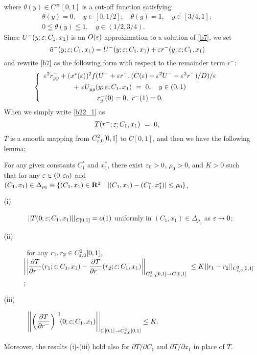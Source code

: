 \documentclass[a4,10pt]{article}
\begin{document}
%
where $\theta(y) \in C^{\infty}[0,1]$ is a cut-off function satisfying 
\begin{equation*}
\begin{array}{c}
\theta(y) = 0, \quad y \in [0, 1/2]; \quad \theta(y) = 1, \quad y \in [3/4, 1]; \\[1ex]
 0 \leqq \theta(y) \leqq 1, \quad y \in (1/2, 3/4). 
\end{array}
\end{equation*}
Since $U^-(y;\varepsilon;C_1,x_1)$ is an $O(\varepsilon)$ approximation to a solution of \eqref{b7}, we set
%
\begin{equation}\label{b22_0}
\tilde{u}^-(y;\varepsilon;C_1,x_1) = U^-(y;\varepsilon;C_1,x_1) + \varepsilon r^-(y;\varepsilon;C_1,x_1) 
\end{equation}
%
and rewrite \eqref{b7} as the following form with respect to the remainder term $r^-$: 
%
\begin{equation}\label{b22_1}
\left \{
\begin{array}{c}
\varepsilon^2 r^-_{yy} + (x^*(\varepsilon))^2 f(U^- +\varepsilon r^- ,  (C(\varepsilon) - \varepsilon^2 U^- -\varepsilon^3 r^- )/D ) /\varepsilon \\[1ex]
+ \ \varepsilon U^-_{yy}(y;\varepsilon;C_1,x_1) \ = \ 0, \ \ \ y \in (0, 1)   \\[1ex]
r^-_y(0) = 0, \ r^-(1) = 0.
\end{array} 
\right.
\end{equation}
%
When we simply write \eqref{b22_1} as 
\begin{equation}\label{b22_2}
\begin{array}{c}
T(r^-;\varepsilon;C_1,x_1) \ = \ 0, 
\end{array} 
\end{equation}
$T$ is a smooth mapping from $C^2_{\varepsilon,0}[0,1]$ to $C[0,1]$, and then we have the following lemma: 
%
\begin{lemma}\label{lem1b} 
For any given constants $C_1^*$ and $x_1^*$, there exist $\varepsilon_0 > 0$, $\rho_0 > 0$, and $K >0$ such that for any 
$\varepsilon \in (0, \varepsilon_0)$ and $(C_1,x_1) \in \Delta_{\rho_0} \equiv \{(C_1,x_1) \in {\bf R}^2 \ | \ |(C_1,x_1) - (C^*_1,x^*_1)| \leq \rho_0 \}$, 
\begin{description}
\item[(i)] \  $||T(0;\varepsilon;C_1,x_1) ||_{C[0,1]} = o(1)$ uniformly in $(C_1,x_1) \in \Delta_{\rho_0}$ as $\varepsilon \to 0$; 
\item[(ii)] \ for any $r_1, r_2 \in C^2_{\varepsilon,0}[0,1]$, \\[1ex]
$\displaystyle{ \left|\left| \frac {\partial T}{\partial r^-}(r_1;\varepsilon;C_1,x_1) -  \frac {\partial T}{\partial r^-}(r_2;\varepsilon;C_1,x_1) \right|\right|_{C^2_{\varepsilon,0}[0,1] \to C[0,1]}
 \ \leq K || r_1 - r_2||_{C^2_{\varepsilon,0}[0,1]} }$; 
\item[(iii)] \ \hspace*{0.5cm}$ \displaystyle{ \left|\left|  \left( \frac {\partial T}{\partial r^-} \right)^{ \! \! -1}  \! \! (0;\varepsilon;C_1,x_1) \right|\right|_{C[0,1] \to C^2_{\varepsilon,0}[0,1]}  \leq K.  }$ 
\end{description}
Moreover, the results (i)-(iii) hold also for $\partial T/\partial C_1$ and $\partial T/\partial x_1$ in place of $T$.
\end{lemma}
\end{document}
